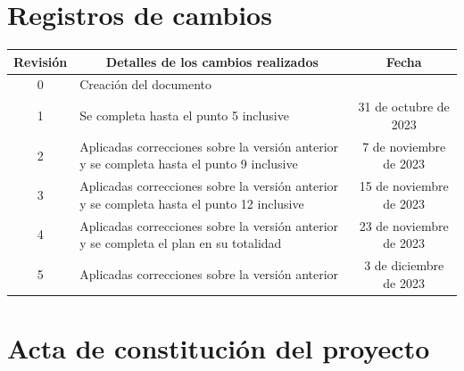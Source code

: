 \documentclass[
11pt, %
]{Clases/charter}
\begin{document}
\maketitle
\thispagestyle{empty}
\pagebreak


\thispagestyle{empty}
{\setlength{\parskip}{0pt}
	\tableofcontents{}
}
\pagebreak


\section*{Registros de cambios}
\label{sec:registro}


\begin{table}[ht]
	\label{tab:registro}
	\centering
	\begin{tabularx}{\linewidth}{@{}|c|X|c|@{}}
		\hline
		\rowcolor[HTML]{C0C0C0}
		Revisión & \multicolumn{1}{c|}{\cellcolor[HTML]{C0C0C0}Detalles de los cambios realizados}            & Fecha                   \\ \hline
		0        & Creación del documento                                                                     & \fechaInicioName        \\ \hline
		1        & Se completa hasta el punto 5 inclusive                                                     & 31 de octubre de 2023   \\ \hline
		2        & Aplicadas correcciones sobre la versión anterior y se completa hasta el punto 9 inclusive  & 7 de noviembre de 2023  \\ \hline
		3        & Aplicadas correcciones sobre la versión anterior y se completa hasta el punto 12 inclusive & 15 de noviembre de 2023 \\ \hline
		4        & Aplicadas correcciones sobre la versión anterior y se completa el plan en su totalidad     & 23 de noviembre de 2023 \\ \hline
		5        & Aplicadas correcciones sobre la versión anterior                                           & 3 de diciembre de 2023  \\ \hline
	\end{tabularx}
\end{table}

\pagebreak



\section*{Acta de constitución del proyecto}
\label{sec:acta}
\end{document}
